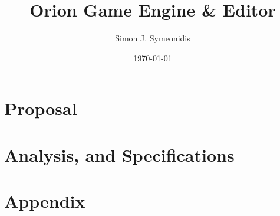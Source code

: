 \documentclass[twoside,12pt]{book}
\title{Orion Game Engine \& Editor}
\author{Simon J. Symeonidis}
\date{\today}
\begin{document}

\pagestyle{fancy}
\maketitle
\newpage
\rhead[]{\textbf{\color{psyan}\nouppercase{\rightmark}}}
\lhead[\textbf{\color{psyan}\nouppercase{\leftmark}}]{}

\newpage
\setcounter{tocdepth}{3}
\tableofcontents
\listoffigures
\newpage


\rfoot[]{\thepage}
\cfoot{}
\lfoot[\thepage]{}

\chapter{Proposal}



\chapter{Analysis, and Specifications}




\chapter{Appendix}


\begingroup
\raggedright


\endgroup
\end{document}
